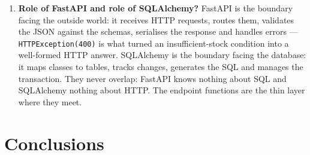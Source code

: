 \documentclass[10pt,a4paper]{article}
\begin{document}
\begin{enumerate}[leftmargin=0.7cm]
\item \textbf{Role of FastAPI and role of SQLAlchemy?} FastAPI is the boundary
facing the outside world: it receives HTTP requests, routes them, validates the
JSON against the schemas, serialises the response and handles errors ---
\texttt{HTTPException(400)} is what turned an insufficient-stock condition into
a well-formed HTTP answer. SQLAlchemy is the boundary facing the database: it
maps classes to tables, tracks changes, generates the SQL and manages the
transaction. They never overlap: FastAPI knows nothing about SQL and SQLAlchemy
nothing about HTTP. The endpoint functions are the thin layer where they meet.

\end{enumerate}

\section{Conclusions}
\end{document}
